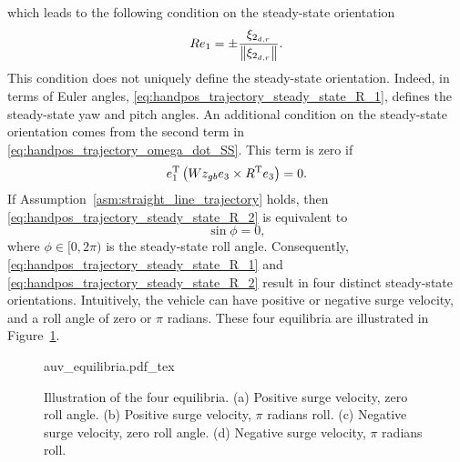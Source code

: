 which leads to the following condition on the steady-state orientation
\begin{equation}
    R e_1 = \pm \frac{\xi_{2_{d, r}}}{\left\|\xi_{2_{d, r}}\right\|}. \label{eq:handpos_trajectory_steady_state_R_1}
\end{equation}
This condition does not uniquely define the steady-state orientation.
Indeed, in terms of Euler angles, \eqref{eq:handpos_trajectory_steady_state_R_1}, defines the steady-state yaw and pitch angles.
An additional condition on the steady-state orientation comes from the second term in \eqref{eq:handpos_trajectory_omega_dot_SS}.
This term is zero if
\begin{equation}
    e_1^{\mathrm{T}} \left(Wz_{gb} e_3 \times R^{\mathrm{T}} e_3\right) = 0. \label{eq:handpos_trajectory_steady_state_R_2}
\end{equation}
If Assumption~\ref{asm:straight_line_trajectory} holds, then \eqref{eq:handpos_trajectory_steady_state_R_2} is equivalent to
\begin{equation}
    \sin\phi = 0,
\end{equation}
where $\phi \in [0, 2\pi)$ is the steady-state roll angle.
Consequently, \eqref{eq:handpos_trajectory_steady_state_R_1} and \eqref{eq:handpos_trajectory_steady_state_R_2} result in four distinct steady-state orientations.
Intuitively, the vehicle can have positive or negative surge velocity, and a roll angle of zero or $\pi$ radians.
These four equilibria are illustrated in Figure~\ref{fig:equilibria}.

\begin{figure}[tb]
    \centering
    \def\svgwidth{0.48\textwidth}
    {auv_equilibria.pdf_tex}
    \caption{Illustration of the four equilibria. (a) Positive surge velocity, zero roll angle. (b) Positive surge velocity, $\pi$ radians roll. (c) Negative surge velocity, zero roll angle. (d) Negative surge velocity, $\pi$ radians roll.}
    \label{fig:equilibria}
\end{figure}

